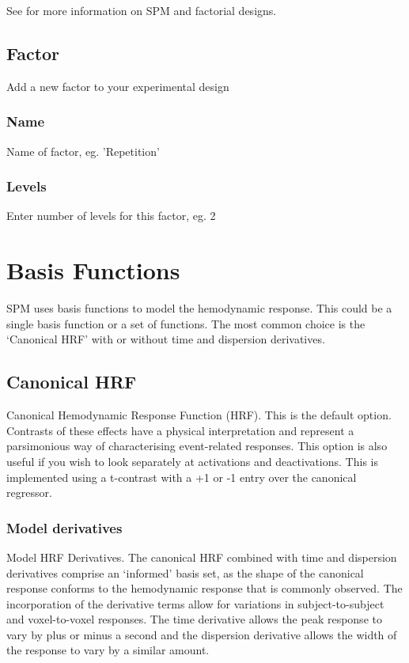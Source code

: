 \documentclass[a4paper,titlepage]{book}
\begin{document}
See \cite{rnah_anova} for more information on SPM and factorial designs.

\subsection{Factor}
Add a new factor to your experimental design


\subsubsection{Name}
Name of factor, eg. 'Repetition' 


\subsubsection{Levels}
Enter number of levels for this factor, eg. 2


\section{Basis Functions}

SPM uses basis functions to model the hemodynamic response. This could 
be a single basis function or a set of functions.
The most common choice is the `Canonical HRF' with or without time and dispersion derivatives. 


\subsection{Canonical HRF}
Canonical Hemodynamic Response Function (HRF). This is the default option. Contrasts of these effects have a physical interpretation and represent a parsimonious way of characterising event-related responses. This option is also useful if you wish to look separately at activations and deactivations. This is implemented using a t-contrast with a +1 or -1 entry over the canonical regressor. 


\subsubsection{Model derivatives}
Model HRF Derivatives. The canonical HRF combined with time and dispersion derivatives comprise an `informed' basis set, as the shape of the canonical response conforms to the hemodynamic response that is commonly observed. The incorporation of the derivative terms allow for variations in subject-to-subject and voxel-to-voxel responses. The time derivative allows the peak response to vary by plus or minus a second and the dispersion derivative allows the width of the response to vary by a similar amount. 
\end{document}
